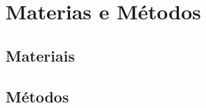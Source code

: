 
\chapter{Materias e Métodos}\label{cap:materialemetodos}

\section{Materiais}\label{sec:materiais}


\section{Métodos}\label{sec:metodo}

